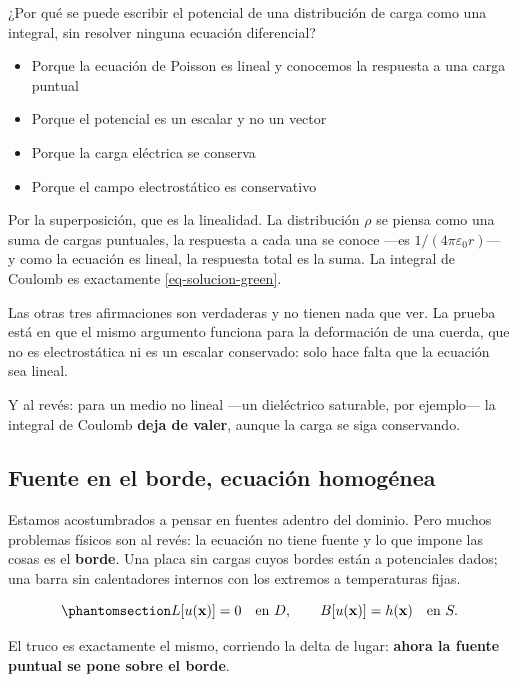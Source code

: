 \documentclass[
  spanish,
  a4paper,
]{scrbook}
\providecommand{\tightlist}{%
  \setlength{\itemsep}{0pt}\setlength{\parskip}{0pt}}
\theoremstyle{definition}
\theoremstyle{plain}
\theoremstyle{definition}
\theoremstyle{plain}
\theoremstyle{definition}
\theoremstyle{remark}
\begin{document}
¿Por qué se puede escribir el potencial de una distribución de carga
como una integral, sin resolver ninguna ecuación diferencial?

\begin{itemize}
\tightlist
\item
  {Porque la ecuación de Poisson es lineal y conocemos la respuesta a
  una carga puntual}
\item
  {Porque el potencial es un escalar y no un vector}
\item
  {Porque la carga eléctrica se conserva}
\item
  {Porque el campo electrostático es conservativo}
\end{itemize}

Por la superposición, que es la linealidad. La distribución \(\rho\) se
piensa como una suma de cargas puntuales, la respuesta a cada una se
conoce ---es \(1/(4\pi\varepsilon_0 r)\)--- y como la ecuación es
lineal, la respuesta total es la suma. La integral de Coulomb es
exactamente \ref{eq-solucion-green}.

Las otras tres afirmaciones son verdaderas y no tienen nada que ver. La
prueba está en que el mismo argumento funciona para la deformación de
una cuerda, que no es electrostática ni es un escalar conservado: solo
hace falta que la ecuación sea lineal.

Y al revés: para un medio no lineal ---un dieléctrico saturable, por
ejemplo--- la integral de Coulomb \textbf{deja de valer}, aunque la
carga se siga conservando.

\subsection{Fuente en el borde, ecuación
homogénea}\label{sec-green-caso-2}

Estamos acostumbrados a pensar en fuentes adentro del dominio. Pero
muchos problemas físicos son al revés: la ecuación no tiene fuente y lo
que impone las cosas es el \textbf{borde}. Una placa sin cargas cuyos
bordes están a potenciales dados; una barra sin calentadores internos
con los extremos a temperaturas fijas.

\begin{equation}\protect\phantomsection\label{eq-problema-green-2}{
L[u(\mathbf{x})] = 0 \quad\text{en } D, \qquad
B[u(\mathbf{x})] = h(\mathbf{x}) \quad\text{en } S .
}\end{equation}

El truco es exactamente el mismo, corriendo la delta de lugar:
\textbf{ahora la fuente puntual se pone sobre el borde}.
\end{document}
